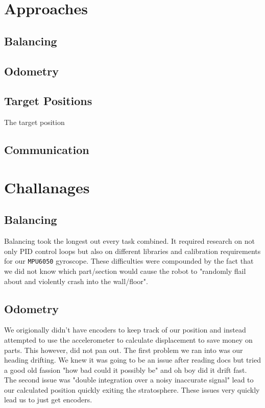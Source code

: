 \documentclass[12pt]{article}
\begin{document}
\section{Approaches}


\subsection{Balancing}
\subsection{Odometry}
\subsection{Target Positions}
The target position 
\subsection{Communication}

\section{Challanages}

\subsection{Balancing}
Balancing took the longest out every task combined. It required research on not only PID control loops but also on different libraries and calibration requirements for our \texttt{MPU6050} gyroscope. These difficulties were compounded by the fact that we did not know which part/section would cause the robot to "randomly flail about and violently crash into the wall/floor". 

\subsection{Odometry}
We origionally didn't have encoders to keep track of our position and instead attempted to use the accelerometer to calculate displacement to save money on parts. This however, did not pan out. The first problem we ran into was our heading drifting. We knew it was going to be an issue after reading docs but tried a good old fassion "how bad could it possibly be" and oh boy did it drift fast. The second issue was "double integration over a noisy inaccurate signal" lead to our calculated position quickly exiting the stratosphere. These issues very quickly lead us to just get encoders.
\end{document}
